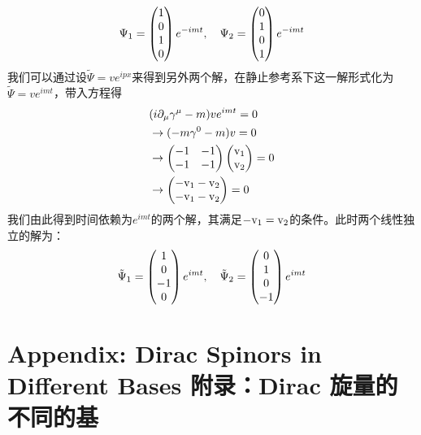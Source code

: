 \begin{equation}
\Psi_1=\begin{pmatrix} 1\\0\\1\\0 \end{pmatrix} e^{-imt},~~~\Psi_2=\begin{pmatrix} 0\\1\\0\\1 \end{pmatrix} e^{-imt}
\end{equation}
我们可以通过设$\tilde \Psi =ve^{ipx}$来得到另外两个解，在静止参考系下这一解形式化为$\tilde \Psi=ve^{imt}$，带入方程得
\begin{equation}
\begin{split}
&(i\partial_\mu\gamma^\mu-m)ve^{imt}=0\\
&\to (-m\gamma^0-m)v=0\\
&\to \begin{pmatrix} -1 & -1 \\ -1 & -1 \end{pmatrix} \begin{pmatrix} \rm v_1 \\ \rm v_2 \end{pmatrix} =0\\
&\to \begin{pmatrix} \rm -v_1-v_2 \\ \rm -v_1-v_2 \end{pmatrix} =0
\end{split}
\end{equation}
我们由此得到时间依赖为$e^{imt}$的两个解，其满足$\rm -v_1=v_2$的条件。此时两个线性独立的解为：
\begin{equation}
\tilde \Psi_1=\begin{pmatrix} 1\\0\\-1\\0 \end{pmatrix} e^{imt},~~~\tilde \Psi_2=\begin{pmatrix} 0\\1\\0\\-1 \end{pmatrix} e^{imt}
\end{equation}



\section[附录：Dirac 旋量的不同的基]{Appendix: Dirac Spinors in Different Bases 附录：Dirac 旋量的不同的基}\label{sec8.10}

